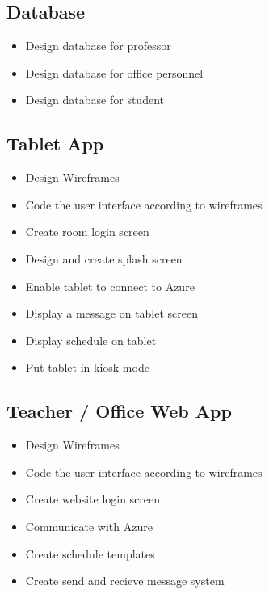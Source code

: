 \documentclass{article}
\begin{document}
\subsection*{Database}
\begin{itemize}
	\item Design database for professor
	\item Design database for office personnel
	\item Design database for student
\end{itemize}

\subsection*{Tablet App}
\begin{itemize}
	\item Design Wireframes
	\item Code the user interface according to wireframes
	\item Create room login screen
	\item Design and create splash screen
	\item Enable tablet to connect to Azure
	\item Display a message on tablet screen
	\item Display schedule on tablet	
	\item Put tablet in kiosk mode
\end{itemize}

\subsection*{Teacher / Office Web App}
\begin{itemize}
	\item Design Wireframes
	\item Code the user interface according to wireframes
	\item Create website login screen
	\item Communicate with Azure
	\item Create schedule templates
	\item Create send and recieve message system
\end{itemize}
\end{document}
